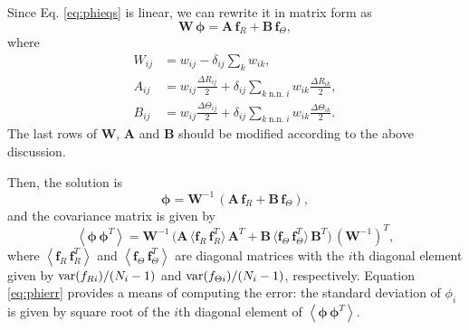\documentclass{article}
\begin{document}
Since Eq. \eqref{eq:phieqs} is linear,
we can rewrite it in matrix form as
\begin{equation*}
\mathbf W \, \pmb\phi = \mathbf A \, \mathbf f_R + \mathbf B \, \mathbf f_\Theta,
\end{equation*}
where
\begin{align*}
  W_{ij}
  &=
  w_{ij} - \delta_{ij} \sum_k w_{ik}
  ,
  \\
  A_{ij}
  &=
  w_{ij} \frac{ \Delta R_{ij} } { 2 }
  +
  \delta_{ij}
  \sum_{k \mathrm{\; n.n. \; } i }
  w_{ik} \frac{ \Delta R_{ik} } { 2 }
  ,
  \\
  B_{ij}
  &=
  w_{ij} \frac{ \Delta \Theta_{ij} } { 2 }
  +
  \delta_{ij}
  \sum_{k \mathrm{\; n.n. \; } i }
  w_{ik} \frac{ \Delta \Theta_{ik} } { 2 }
  .
\end{align*}
The last rows of $\mathbf W$, $\mathbf A$ and $\mathbf B$
should be modified according to the above discussion.


Then, the solution is
\begin{equation}
\pmb\phi = \mathbf W^{-1} \, ( \mathbf A \, \mathbf f_R + \mathbf B \, \mathbf f_\Theta ),
\label{eq:phif}
\end{equation}
and the covariance matrix is given by
\begin{equation}
  \left\langle
    \pmb\phi \, \pmb\phi^T
  \right\rangle
  =
  \mathbf W^{-1} \,
  \bigl(
    \mathbf A \, \langle \mathbf f_R \, \mathbf f_R^T \rangle \, \mathbf A^T
    +
    \mathbf B \, \langle \mathbf f_\Theta \, \mathbf f_\Theta^T \rangle \, \mathbf B^T
  \bigr) \,
  (\mathbf W^{-1})^T
  ,
\label{eq:phierr}
\end{equation}
where
$\left\langle \mathbf f_R \, \mathbf f_R^T \right\rangle$
and
$\left\langle \mathbf f_\Theta \, \mathbf f_\Theta^T \right\rangle$
are diagonal matrices with the $i$th diagonal element given by
$\mathrm{var}(f_{R i})/(N_i - 1)$ and
$\mathrm{var}(f_{\Theta i})/(N_i - 1)$, respectively.
%
Equation \eqref{eq:phierr} provides a means of computing the error:
the standard deviation of $\phi_i$
is given by square root of the $i$th diagonal element
of $\left\langle \pmb\phi \, \pmb\phi^T \right\rangle$.



%
%
\end{document}
